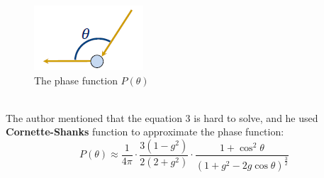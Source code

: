 \begin{figure}[htp]
\begin{center}
\includegraphics[scale=1.0]{images/phasefunction.png}
\caption{The phase function $P(\theta)$}
\label{f7}
\end{center}
\end{figure}
\\The author mentioned that the equation 3 is hard to solve, and he used \textbf{Cornette-Shanks} function to approximate the phase function:
\begin{equation}
P(\theta) \approx \frac{1}{4\pi} \cdot \frac{3(1-g^2)}{2(2+g^2)} \cdot \frac{1+\cos^2 {\theta}}{(1+g^2-2g\cos{\theta})^{\frac{3}{2}}}
\end{equation}